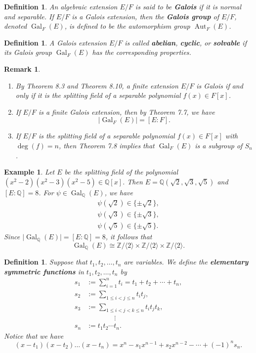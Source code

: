 \documentclass[10pt]{article}
\newcommand{\Z}{\mathbb{Z}}
\newcommand{\Q}{\mathbb{Q}}
\DeclareMathOperator{\Aut}{Aut}
\DeclareMathOperator{\Gal}{Gal}
\theoremstyle{newstyle}
\newtheorem{remark}[thm]{Remark}
\newtheorem{defn}[thm]{Definition}
\newtheorem{exmp}[thm]{Example}
\begin{document}
\begin{defn}
An algebraic extension $E/F$ is said to be {\bf Galois} if it is normal and separable. 
If $E/F$ is a Galois extension, then the {\bf Galois group} of $E/F$, denoted 
$\Gal_F(E)$, is defined to be the automorphism group $\Aut_F(E)$. 
\end{defn}

\begin{defn}
A Galois extension $E/F$ is called {\bf abelian}, {\bf cyclic}, or {\bf solvable} if its 
Galois group $\Gal_F(E)$ has the corresponding properties. 
\end{defn}

\begin{remark}~
\begin{enumerate}[(1)]
    \item By Theorem 8.3 and Theorem 8.10, a finite extension $E/F$ is Galois
    if and only if it is the splitting field of a separable polynomial $f(x) \in F[x]$. 
    \item If $E/F$ is a finite Galois extension, then by Theorem 7.7, we have 
    \[ \lvert\Gal_F(E)\rvert = [E : F]. \]
    \item If $E/F$ is the splitting field of a separable polynomial $f(x) \in F[x]$ with 
    $\deg(f) = n$, then Theorem 7.8 implies that $\Gal_F(E)$ is a subgroup of $S_n$. 
\end{enumerate}
\end{remark}

\begin{exmp}
Let $E$ be the splitting field of the polynomial 
$(x^2 - 2)(x^2 - 3)(x^2 - 5) \in \Q[x]$. Then $E = \Q(\sqrt2, \sqrt3, \sqrt5)$ and 
$[E : \Q] = 8$. For $\psi \in \Gal_{\Q}(E)$, we have 
\begin{align*}
    \psi(\sqrt2) \in \{\pm\sqrt2\}, \\
    \psi(\sqrt3) \in \{\pm\sqrt3\}, \\
    \psi(\sqrt5) \in \{\pm\sqrt5\}.
\end{align*}
Since $\lvert\Gal_{\Q}(E)\vert = [E : \Q] = 8$, it follows that 
\[ \Gal_{\Q}(E) \cong \Z/\langle 2 \rangle \times \Z/\langle 2 \rangle \times \Z/\langle 2 \rangle. \]
\end{exmp}

\begin{defn}
Suppose that $t_1, t_2, \dots, t_n$ are variables. We define the {\bf elementary symmetric functions} 
in $t_1, t_2, \dots, t_n$ by 
\begin{align*}
    s_1 &:= \textstyle\sum_{i=1}^n t_i = t_1 + t_2 + \cdots + t_n, \\
    s_2 &:= \textstyle\sum_{1 \leq i < j \leq n} t_i t_j, \\
    s_3 &:= \textstyle\sum_{1 \leq i < j < k \leq n} t_i t_j t_k, \\
    & \qquad\qquad \vdots \\
    s_n &:= t_1t_2 \cdots t_n. 
\end{align*}
Notice that we have 
\[ (x-t_1)(x-t_2) \dots (x-t_n) = x^n - s_1 x^{n-1} + s_2 x^{n-2} - \cdots + (-1)^n s_n. \]
\end{defn}
\end{document}
